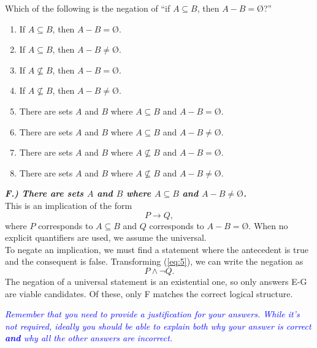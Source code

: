 \documentclass{article}
\renewcommand{\(}{\left(}
\renewcommand{\)}{\right)}
\renewcommand{\emptyset}{\text{\O}}
\renewcommand{\emph}[1]{\textit{\textbf{#1}}}
\theoremstyle{plain}
\theoremstyle{plain}
\theoremstyle{definition}
\begin{document}
Which of the following is the negation of ``if $A \subseteq B$, then $A - B = \emptyset$?''

\begin{enumerate}[label=\Alph*)]
    \item If $A \subseteq B$, then $A - B = \emptyset$.
    \item If $A \subseteq B$, then $A - B \neq \emptyset$.
    \item If $A \not\subseteq B$, then $A - B = \emptyset$.
    \item If $A \not\subseteq B$, then $A - B \neq \emptyset$.
    \item There are sets $A$ and $B$ where $A \subseteq B$ and $A - B = \emptyset$.
    \item There are sets $A$ and $B$ where $A \subseteq B$ and $A - B \neq \emptyset$.
    \item There are sets $A$ and $B$ where $A \not\subseteq B$ and $A - B = \emptyset$.
    \item There are sets $A$ and $B$ where $A \not\subseteq B$ and $A - B \neq \emptyset$.
\end{enumerate}

\begin{shaded}
\emph{F.) There are sets $A$ and $B$ where $A \subseteq B$ and $A - B \neq \emptyset$.} \\

This is an implication of the form 
\begin{equation} \label{eq:5}
P \rightarrow Q,
\end{equation}
where $P$ corresponds to $A \subseteq B$ and $Q$ corresponds to $A - B = \emptyset$.
When no explicit quantifiers are used, we assume the universal. \\
To negate an implication, we must find a statement where the antecedent is true and the consequent is false. Transforming (\ref{eq:5}), we can write the negation as
\begin{equation}
P \land \neg Q.
\end{equation}
The negation of a universal statement is an existential one, so only answers E-G are viable candidates. Of these, only F matches the correct logical structure.
\end{shaded}

\textit{\textcolor{blue}{Remember that you need to provide a justification for your answers. While it's not required, ideally you should be able to explain both why your answer is correct \textbf{and} why all the other answers are incorrect.}}
\end{document}
